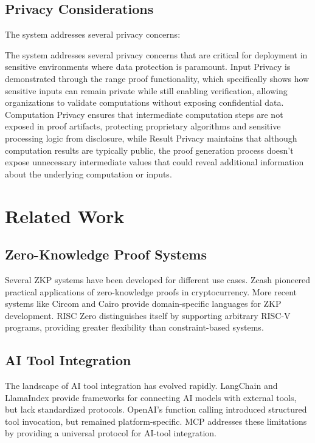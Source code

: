 \documentclass[11pt]{article}
\begin{document}
\subsection{Privacy Considerations}

The system addresses several privacy concerns:

The system addresses several privacy concerns that are critical for deployment in sensitive environments where data protection is paramount. Input Privacy is demonstrated through the range proof functionality, which specifically shows how sensitive inputs can remain private while still enabling verification, allowing organizations to validate computations without exposing confidential data. Computation Privacy ensures that intermediate computation steps are not exposed in proof artifacts, protecting proprietary algorithms and sensitive processing logic from disclosure, while Result Privacy maintains that although computation results are typically public, the proof generation process doesn't expose unnecessary intermediate values that could reveal additional information about the underlying computation or inputs.

\section{Related Work}
\label{sec:related}

\subsection{Zero-Knowledge Proof Systems}

Several ZKP systems have been developed for different use cases. Zcash pioneered practical applications of zero-knowledge proofs in cryptocurrency. More recent systems like Circom and Cairo provide domain-specific languages for ZKP development. RISC Zero distinguishes itself by supporting arbitrary RISC-V programs, providing greater flexibility than constraint-based systems.

\subsection{AI Tool Integration}

The landscape of AI tool integration has evolved rapidly. LangChain and LlamaIndex provide frameworks for connecting AI models with external tools, but lack standardized protocols. OpenAI's function calling introduced structured tool invocation, but remained platform-specific. MCP addresses these limitations by providing a universal protocol for AI-tool integration.
\end{document}
